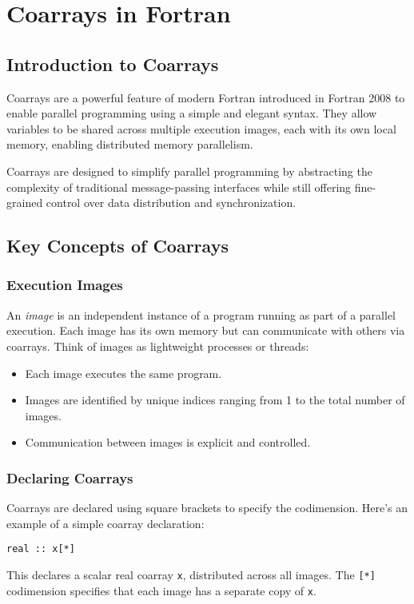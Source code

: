 \chapter{Coarrays in Fortran}

\section{Introduction to Coarrays}

Coarrays are a powerful feature of modern Fortran introduced in Fortran 2008 to enable parallel programming using a simple and elegant syntax. They allow variables to be shared across multiple execution images, each with its own local memory, enabling distributed memory parallelism.

Coarrays are designed to simplify parallel programming by abstracting the complexity of traditional message-passing interfaces while still offering fine-grained control over data distribution and synchronization.

\section{Key Concepts of Coarrays}

\subsection{Execution Images}
An \emph{image} is an independent instance of a program running as part of a parallel execution. Each image has its own memory but can communicate with others via coarrays. Think of images as lightweight processes or threads:
\begin{itemize}
    \item Each image executes the same program.
    \item Images are identified by unique indices ranging from 1 to the total number of images.
    \item Communication between images is explicit and controlled.
\end{itemize}

\subsection{Declaring Coarrays}
Coarrays are declared using square brackets to specify the codimension. Here’s an example of a simple coarray declaration:
\begin{lstlisting}
real :: x[*]
\end{lstlisting}
This declares a scalar real coarray \texttt{x}, distributed across all images. The \texttt{[*]} codimension specifies that each image has a separate copy of \texttt{x}.

